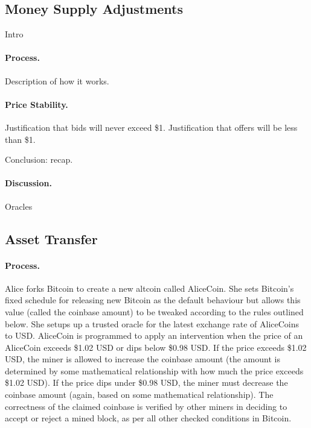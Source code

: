 


\subsection{Money Supply Adjustments}
\label{sec:elastic}

Intro

\paragraph{Process.} Description of how it works.

\paragraph{Price Stability.} Justification that bids will never exceed \$1. Justification that offers will be less than \$1.

Conclusion: recap.

\paragraph{Discussion.} Oracles


\subsection{Asset Transfer}
\label{sec:basecoin}


\paragraph{Process.} Alice forks Bitcoin to create a new altcoin called AliceCoin. She sets Bitcoin's fixed schedule for releasing new Bitcoin as the default behaviour but allows this value (called the coinbase amount) to be tweaked according to the rules outlined below. She setups up a trusted oracle for the latest exchange rate of AliceCoins to USD. AliceCoin is programmed to apply an intervention when the price of an AliceCoin exceeds \$1.02 USD or dips below \$0.98 USD. If the price exceeds \$1.02 USD, the miner is allowed to increase the coinbase amount (the amount is determined by some mathematical relationship with how much the price exceeds \$1.02 USD). If the price dips under \$0.98 USD, the miner must decrease the coinbase amount (again, based on some mathematical relationship). The correctness of the claimed coinbase is verified by other miners in deciding to accept or reject a mined block, as per all other checked conditions in Bitcoin.

